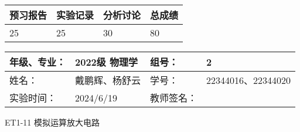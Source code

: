 \documentclass[dvipsnames, svgnames,a4paper,11pt]{article}
\begin{document}
	
	
	
	
	\begin{table}
		\renewcommand\arraystretch{1.7}
		\begin{tabularx}{\textwidth}{
				|X|X|X|X
				|X|X|X|X|}
			\hline
			\multicolumn{2}{|c|}{预习报告}&\multicolumn{2}{|c|}{实验记录}&\multicolumn{2}{|c|}{分析讨论}&\multicolumn{2}{|c|}{总成绩}\\
			\hline
			\LARGE25 & & \LARGE25 & & \LARGE30 & & \LARGE80 & \\
			\hline
		\end{tabularx}
	\end{table}
	
	\begin{table}
		\renewcommand\arraystretch{1.7}
		\begin{tabularx}{\textwidth}{|X|X|X|X|}
			\hline
			年级、专业： & 2022级 物理学 &组号： & 2\\
			\hline
			姓名： & 戴鹏辉、杨舒云  & 学号： & 22344016、22344020\\
			\hline
			实验时间： & 2024/6/19 & 教师签名： & \\
			\hline
		\end{tabularx}
	\end{table}
	
	\begin{center}
		\LARGE ET1-11 \quad 模拟运算放大电路
	\end{center}
	
	
\end{document}
